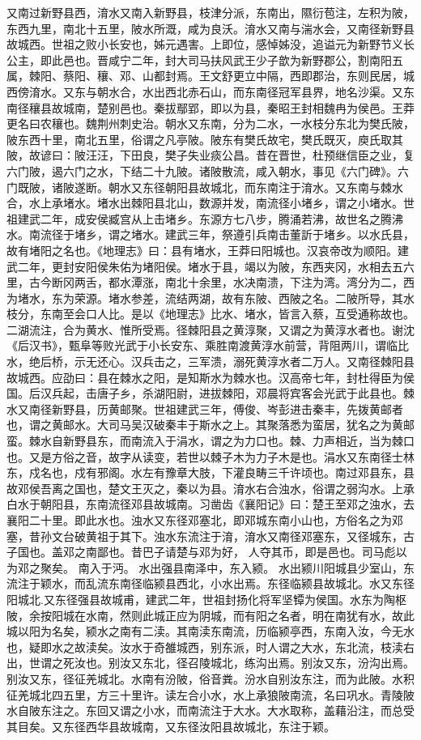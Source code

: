 \documentclass[12pt,UTF8]{ctexbook}
\begin{document}
又南过新野县西，淯水又南入新野县，枝津分派，东南出，隰衍苞注，左积为陂，东西九里，南北十五里，陂水所溉，咸为良沃。淯水又南与湍水会，又南径新野县故城西。世祖之败小长安也，姊元遇害。上即位，感悼姊没，追谥元为新野节义长公主，即此邑也。晋咸宁二年，封大司马扶风武王少子歆为新野郡公，割南阳五属，棘阳、蔡阳、穰、邓、山都封焉。王文舒更立中隔，西即郡治，东则民居，城西傍淯水。又东与朝水合，水出西北赤石山，而东南径冠军县界，地名沙渠。又东南径穰县故城南，楚别邑也。秦拔鄢郢，即以为县，秦昭王封相魏冉为侯邑。王莽更名曰农穰也。魏荆州刺史治。朝水又东南，分为二水，一水枝分东北为樊氏陂，陂东西十里，南北五里，俗谓之凡亭陂。陂东有樊氏故宅，樊氏既灭，庾氏取其陂，故谚曰：陂汪汪，下田良，樊子失业痰公昌。昔在晋世，杜预继信臣之业，复六门陂，遏六门之水，下结二十九陂。诸陂散流，咸入朝水，事见《六门碑》。六门既陂，诸陂遂断。朝水又东径朝阳县故城北，而东南注于淯水。又东南与棘水合，水上承堵水。堵水出棘阳县北山，数源并发，南流径小堵乡，谓之小堵水。世祖建武二年，成安侯臧宫从上击堵乡。东源方七八步，腾涌若沸，故世名之腾沸水。南流径于堵乡，谓之堵水。建武三年，祭遵引兵南击董訢于堵乡。以水氏县，故有堵阳之名也。《地理志》曰：县有堵水，王莽曰阳城也。汉哀帝改为顺阳。建武二年，更封安阳侯朱佑为堵阳侯。堵水于县，竭以为陂，东西夹冈，水相去五六里，古今断冈两舌，都水潭涨，南北十余里，水决南溃，下注为湾。湾分为二，西为堵水，东为荣源。堵水参差，流结两湖，故有东陂、西陂之名。二陂所导，其水枝分，东南至会口人比。是以《地理志》比水、堵水，皆言入蔡，互受通称故也。二湖流注，合为黄水、惟所受焉。径棘阳县之黄淳聚，又谓之为黄淳水者也。谢沈《后汉书》，甄阜等败光武于小长安东、乘胜南渡黄淳水前营，背阻两川，谓临比水，绝后桥，示无还心。汉兵击之，三军溃，溺死黄淳水者二万人。又南径棘阳县故城西。应劭曰：县在棘水之阳，是知斯水为棘水也。汉高帝七年，封杜得臣为侯国。后汉兵起，击唐子乡，杀湖阳尉，进拔棘阳，邓晨将宾客会光武于此县也。棘水又南径新野县，历黄邮聚。世祖建武三年，傅俊、岑彭进击秦丰，先拨黄邮者也，谓之黄邮水。大司马吴汉破秦丰于斯水之上。其聚落悉为蛮居，犹名之为黄邮蛮。棘水自新野县东，而南流入于涓水，谓之为力口也。棘、力声相近，当为棘口也。又是方俗之音，故字从读变，若世以棘子木为力子木是也。涓水又东南径士林东，戍名也，戍有邪阁。水左有豫章大肢，下灌良畴三千许顷也。南过邓县东，县故邓侯吾离之国也，楚文王灭之，秦以为县。淯水右合浊水，俗谓之弱沟水。上承白水于朝阳县，东南流径邓县故城南。习凿齿《襄阳记》曰：楚王至邓之浊水，去襄阳二十里。即此水也。浊水又东径邓塞北，即邓城东南小山也，方俗名之为邓塞，昔孙文台破黄祖于其下。浊水东流注于淯，淯水又南径邓塞东，又径城东，古子国也。盖邓之南鄙也。昔巴子请楚与邓为好， 人夺其币，即是邑也。司马彪以为邓之聚矣。
南入于沔。
水出强县南泽中，东入颍。
水出颍川阳城县少室山，东流注于颖水，而乱流东南径临颍县西北，小水出焉。东径临颍县故城北。水又东径阳城北.又东径强县故城甫，建武二年，世祖封扬化将军坚镡为侯国。水东为陶枢陂，余按阳城在水南，然则此城正应为阴城，而有阳之名者，明在南犹有水，故此城以阳为名矣，颍水之南有二渎。其南渎东南流，历临颍亭西，东南入汝，今无水也，疑即水之故渎矣。汝水于奇雒城西，别东派，时人谓之大水，东北流，枝渎右出，世谓之死汝也。别汝又东北，径召陵城北，练沟出焉。别汝又东，汾沟出焉。别汝又东，径征羌城北。水南有汾陂，俗音粪。汾水自别汝东注，而为此陂。水积征羌城北四五里，方三十里许。读左合小水，水上承狼陂南流，名曰巩水。青陵陂水自陂东注之。东回又谓之小水，而南流注于大水。大水取称，盖藉沿注，而总受其目矣。又东径西华县故城南，又东径汝阳县故城北，东注于颖。
\end{document}
